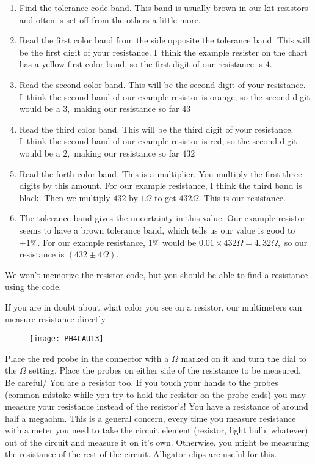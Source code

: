 \begin{enumerate}
    \item Find the tolerance code band. This band is usually brown in our kit resistors and often is set off from the others a little more.

    \item Read the first color band from the side opposite the tolerance band. This will be the first digit of your resistance. I\ think the example resister on the chart has a yellow first color band, so the first digit of our resistance is $4.$

    \item Read the second color band. This will be the second digit of your resistance. I\ think the second band of our example resistor is orange, so the second digit would be a $3,$ making our resistance so far $43$

    \item Read the third color band. This will be the third digit of your resistance. I\ think the second band of our example resistor is red, so the second digit would be a $2,$ making our resistance so far $432$

    \item Read the forth color band. This is a multiplier. You multiply the first three digits by this amount. For our example resistance, I think the third band is black. Then we multiply $432$ by $1\unit{\Omega}$ to get $432\unit{\Omega}.$ This is our resistance.

    \item The tolerance band gives the uncertainty in this value. Our example resistor seems to have a brown tolerance band, which tells us our value is good to $\pm 1\%.$ For our example resistance, $1\%$ would be $0.01\times 432\unit{\Omega}=\allowbreak 4.\,\allowbreak 32\unit{\Omega},$ so our resistance is $\left( 432\pm 4\unit{\Omega}\right) .$
\end{enumerate}

We won't memorize the resistor code, but you should be able to find a resistance using the code.

If you are in doubt about what color you see on a resistor, our multimeters can measure resistance directly. 

\begin{figure}[h!]
	\centering
    \texttt{[image: PH4CAU13]}
\end{figure}

Place the red probe in the connector with a $\Omega $ marked on it and turn the dial to the $\Omega$ setting. Place the probes on either side of the resistance to be measured. Be careful/ You are a resistor too. If you touch your hands to the probes (common mistake while you try to hold the resistor on the probe ends) you may measure your resistance instead of the resistor's! You have a resistance of around half a megaohm. This is a general concern, every time you measure resistance with a meter you need to take the circuit element (resistor, light bulb, whatever) out of the circuit and measure it on it's own. Otherwise, you might be measuring the resistance of the rest of the circuit. Alligator clips are useful for this.

